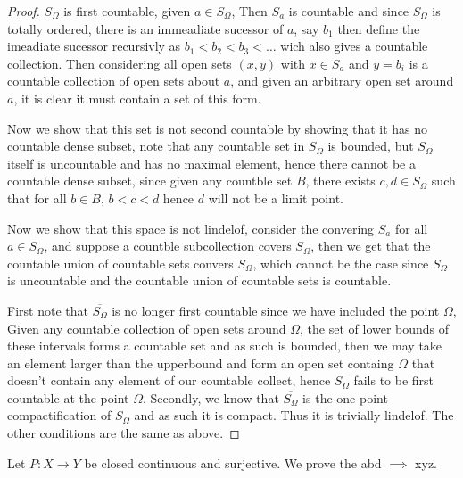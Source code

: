     \begin{proof}
        $S_\Omega$ is first countable, given $a \in S_\Omega$, Then $S_a$ is countable and since $S_\Omega$ is totally ordered, there is an immeadiate sucessor of $a$, say $b_1$ then define the imeadiate sucessor recursivly as $b_1<b_2<b_3<\dots$ wich also gives a countable collection. 
        Then considering all open sets $(x,y)$ with $x \in S_a$ and $y = b_i$ is a countable collection of open sets about $a$, and given an arbitrary open set around $a$, it is clear it must contain a set of this form. 

        Now we show that this set is not second countable by showing that it has no countable dense subset, note that any countable set in $S_\Omega$ is bounded, but $S_\Omega$ itself is uncountable and has no maximal element, hence there cannot be a countable dense subset, since given any countble set 
        $B$, there exists $c, d \in S_\Omega$ such that for all $b \in B$, $b < c < d$ hence $d$ will not be a limit point. 

        Now we show that this space is not lindelof, consider the convering $S_a$ for all $a \in S_\Omega$, and suppose a countble subcollection covers $S_\Omega$, then we get that the countable union of countable sets convers $S_\Omega$, which cannot be the case since $S_\Omega$ is uncountable and 
        the countable union of countable sets is countable. 

        First note that $\overline{S_\Omega}$ is no longer first countable since we have included the point $\Omega$, Given any countable collection of open sets around $\Omega$, the set of lower bounds of these intervals forms a countable set and 
        as such is bounded, then we may take an element larger than the upperbound and form an open set containg $\Omega$ that doesn't contain any element of our countable collect, hence $\overline{S_\Omega}$ fails to be first countable at the point $\Omega$. 
        Secondly, we know that $\overline{S_\Omega}$ is the one point compactification of $S_\Omega$ and as such it is compact. Thus it is trivially lindelof. The other conditions are the same as above. 
    \end{proof} 




    \question
    Let $P:X \to Y$ be closed continuous and surjective. We prove the abd $\implies$ xyz. 
    
